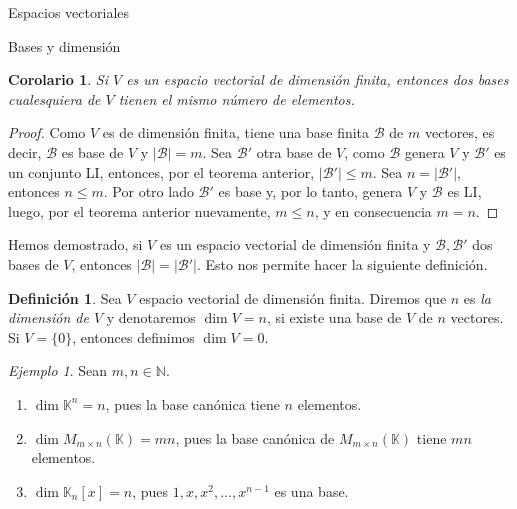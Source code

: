 \documentclass[a4paper,12pt,twoside,spanish,reqno]{amsbook}
\numberwithin{equation}{section}
\newtheorem{corolario}[teorema]{Corolario}
\theoremstyle{definition}
\newtheorem{definicion}[teorema]{Definici\'on}
\theoremstyle{remark}
\newtheorem*{ejemplo*}{Ejemplo}
\newcommand{\K}{\mathbb K}
\begin{document}
\begin{chapter}{Espacios vectoriales}
\begin{section}{Bases y dimensión}
\begin{corolario}
    Si $V$ es un espacio vectorial de dimensión finita, entonces dos bases cualesquiera de $V$ tienen el mismo número de elementos.
\end{corolario}
\begin{proof}
        Como $V$ es de dimensión finita, tiene una base finita $\mathcal B$  de $m$ vectores, es decir,  $\mathcal B$ es base de $V$ y  $|\mathcal B| = m.$
        Sea $\mathcal B'$  otra base de $V$, como $\mathcal B$  genera $V$ y  $\mathcal B'$ es  un conjunto LI, entonces, por el teorema anterior, $|\mathcal B'| \le m$. Sea $n = |\mathcal B'|$,  entonces $n \le m$. Por otro lado $\mathcal B'$ es base y, por lo tanto,  genera $V$ y  $\mathcal B$ es LI, luego, por el teorema anterior nuevamente,  $m \le n$, y en consecuencia $m=n$.
\end{proof}

Hemos demostrado, si $V$  es un espacio vectorial de dimensión finita y $\mathcal B,\mathcal B' $ dos bases de $V$,  entonces $|\mathcal B|=|\mathcal B'|$. Esto nos permite hacer la siguiente definición. 


\begin{definicion}
    Sea $V$ espacio vectorial de dimensión finita. Diremos que $n$  es \textit{la dimensión de $V$} y  denotaremos $\dim V =n$,  si existe una base de $V$  de $n$  vectores. Si $V = \{0\}$,  entonces definimos $\dim V =0$.
\end{definicion}





\begin{ejemplo*} Sean $m,n \in \mathbb N$. 
    \begin{enumerate}
        \item $\dim \K^n= n$, pues  la base canónica tiene $n$ elementos.
        \item $\dim M_{m \times n}(\K) = mn$, pues la base canónica de $M_{m \times n}(\K)$ tiene $mn$  elementos.  
        \item $\dim \K_n[x] =n$, pues $1,x,x^2,\ldots,x^{n-1}$ es una base.   
    \end{enumerate}
\end{ejemplo*}
        

\end{section}
\end{chapter}
\end{document}
